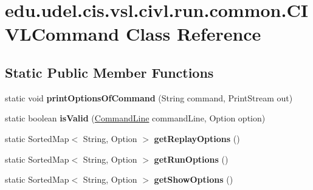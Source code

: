 \hypertarget{classedu_1_1udel_1_1cis_1_1vsl_1_1civl_1_1run_1_1common_1_1CIVLCommand}{}\section{edu.\+udel.\+cis.\+vsl.\+civl.\+run.\+common.\+C\+I\+V\+L\+Command Class Reference}
\label{classedu_1_1udel_1_1cis_1_1vsl_1_1civl_1_1run_1_1common_1_1CIVLCommand}
\subsection*{Static Public Member Functions}
\begin{DoxyCompactItemize}
\item 
\hypertarget{classedu_1_1udel_1_1cis_1_1vsl_1_1civl_1_1run_1_1common_1_1CIVLCommand_abfcf6bc55d7e95fa0497b0a39704cb62}{}static void {\bfseries print\+Options\+Of\+Command} (String command, Print\+Stream out)\label{classedu_1_1udel_1_1cis_1_1vsl_1_1civl_1_1run_1_1common_1_1CIVLCommand_abfcf6bc55d7e95fa0497b0a39704cb62}

\item 
\hypertarget{classedu_1_1udel_1_1cis_1_1vsl_1_1civl_1_1run_1_1common_1_1CIVLCommand_a319a9d46e7c4e3a99356d3e236adce5a}{}static boolean {\bfseries is\+Valid} (\hyperlink{interfaceedu_1_1udel_1_1cis_1_1vsl_1_1civl_1_1run_1_1IF_1_1CommandLine}{Command\+Line} command\+Line, Option option)\label{classedu_1_1udel_1_1cis_1_1vsl_1_1civl_1_1run_1_1common_1_1CIVLCommand_a319a9d46e7c4e3a99356d3e236adce5a}

\item 
\hypertarget{classedu_1_1udel_1_1cis_1_1vsl_1_1civl_1_1run_1_1common_1_1CIVLCommand_a5827f1a638ed3fcdb331ebba3e24d624}{}static Sorted\+Map$<$ String, Option $>$ {\bfseries get\+Replay\+Options} ()\label{classedu_1_1udel_1_1cis_1_1vsl_1_1civl_1_1run_1_1common_1_1CIVLCommand_a5827f1a638ed3fcdb331ebba3e24d624}

\item 
\hypertarget{classedu_1_1udel_1_1cis_1_1vsl_1_1civl_1_1run_1_1common_1_1CIVLCommand_a6d4147b5de540dbd050142bcd9137ad7}{}static Sorted\+Map$<$ String, Option $>$ {\bfseries get\+Run\+Options} ()\label{classedu_1_1udel_1_1cis_1_1vsl_1_1civl_1_1run_1_1common_1_1CIVLCommand_a6d4147b5de540dbd050142bcd9137ad7}

\item 
\hypertarget{classedu_1_1udel_1_1cis_1_1vsl_1_1civl_1_1run_1_1common_1_1CIVLCommand_aef0b6f073da6063bc52b9d250adc0a59}{}static Sorted\+Map$<$ String, Option $>$ {\bfseries get\+Show\+Options} ()\label{classedu_1_1udel_1_1cis_1_1vsl_1_1civl_1_1run_1_1common_1_1CIVLCommand_aef0b6f073da6063bc52b9d250adc0a59}


\end{DoxyCompactItemize}
